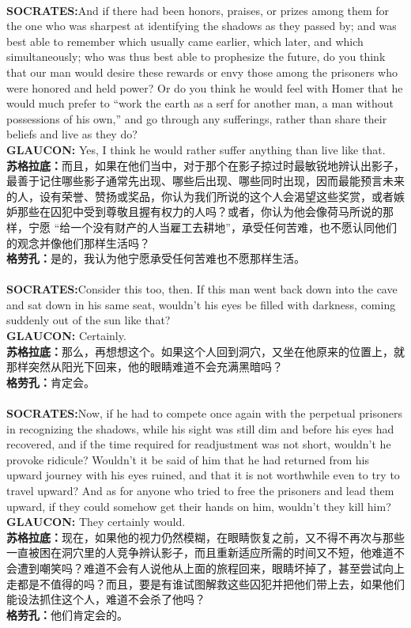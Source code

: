 \documentclass{article}
\begin{document}
\\
\textbf{SOCRATES:}And if there had been honors, praises, or prizes among them for the one who was sharpest at identifying the shadows as they passed by; and was best able to remember which usually came earlier, which later, and which simultaneously; who was thus best able to prophesize the future, do you think that our man would desire these rewards or envy those among the prisoners who were honored and held power? Or do you think he would feel with Homer that he would much prefer to “work the earth as a serf for another man, a man without possessions of his own,” and go through any sufferings, rather than share their beliefs and live as they do?\\
\textbf{GLAUCON: }Yes, I think he would rather suffer anything than live like that.\\
\textbf{苏格拉底：}而且，如果在他们当中，对于那个在影子掠过时最敏锐地辨认出影子，最善于记住哪些影子通常先出现、哪些后出现、哪些同时出现，因而最能预言未来的人，设有荣誉、赞扬或奖品，你认为我们所说的这个人会渴望这些奖赏，或者嫉妒那些在囚犯中受到尊敬且握有权力的人吗？或者，你认为他会像荷马所说的那样，宁愿 “给一个没有财产的人当雇工去耕地”，承受任何苦难，也不愿认同他们的观念并像他们那样生活吗？\\
\textbf{格劳孔：}是的，我认为他宁愿承受任何苦难也不愿那样生活。\\


\\
\textbf{SOCRATES:}Consider this too, then. If this man went back down into the cave and sat down in his same seat, wouldn't his eyes be filled with darkness, coming suddenly out of the sun like that?\\
\textbf{GLAUCON: }Certainly.\\
\textbf{苏格拉底：}那么，再想想这个。如果这个人回到洞穴，又坐在他原来的位置上，就那样突然从阳光下回来，他的眼睛难道不会充满黑暗吗？\\
\textbf{格劳孔：}肯定会。\\

\\
\textbf{SOCRATES:}Now, if he had to compete once again with the perpetual prisoners in recognizing the shadows, while his sight was still dim and before his eyes had recovered, and if the time required for readjustment was not short, wouldn't he provoke ridicule? Wouldn't it be said of him that he had returned from his upward journey with his eyes ruined, and that it is not worthwhile even to try to travel upward? And as for anyone who tried to free the prisoners and lead them upward, if they could somehow get their hands on him, wouldn't they kill him?\\
\textbf{GLAUCON: }They certainly would.\\
\textbf{苏格拉底：}现在，如果他的视力仍然模糊，在眼睛恢复之前，又不得不再次与那些一直被困在洞穴里的人竞争辨认影子，而且重新适应所需的时间又不短，他难道不会遭到嘲笑吗？难道不会有人说他从上面的旅程回来，眼睛坏掉了，甚至尝试向上走都是不值得的吗？而且，要是有谁试图解救这些囚犯并把他们带上去，如果他们能设法抓住这个人，难道不会杀了他吗？\\
\textbf{格劳孔：}他们肯定会的。\\
\end{document}
